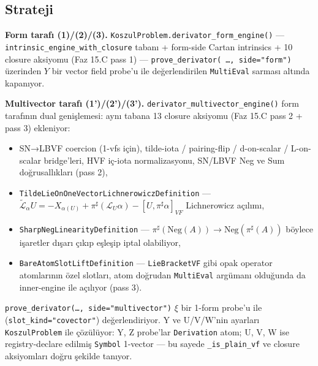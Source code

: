 \documentclass[11pt]{article}
\providecommand{\tightlist}{%
      \setlength{\itemsep}{0pt}\setlength{\parskip}{0pt}}
\begin{document}
    \subsection{Strateji}\label{strateji}

\textbf{Form tarafı (1)/(2)/(3).}
\texttt{KoszulProblem.derivator\_form\_engine()} ---
\texttt{intrinsic\_engine\_with\_closure} tabanı + form-side Cartan
intrinsics + 10 closure aksiyomu (Faz 15.C pass 1) ---
\texttt{prove\_derivator(\ …,\ side="form")} üzerinden \(Y\) bir vector
field probe'u ile değerlendirilen \texttt{MultiEval} sarması altında
kapanıyor.

\textbf{Multivector tarafı (1')/(2')/(3').}
\texttt{derivator\_multivector\_engine()} form tarafının dual
genişlemesi: aynı tabana 13 closure aksiyomu (Faz 15.C pass 2 + pass 3)
ekleniyor:

\begin{itemize}
\tightlist
\item
  SN→LBVF coercion (1-vfs için), tilde-iota / pairing-flip / d-on-scalar
  / L-on-scalar bridge'leri, HVF iç-iota normalizasyonu, SN/LBVF Neg ve
  Sum doğrusallıkları (pass 2),
\item
  \texttt{TildeLieOnOneVectorLichnerowiczDefinition} ---
  \(\tilde{\mathcal{L}}_\alpha U
  = -X_{\alpha(U)} + \pi^\sharp(\mathcal{L}_U \alpha) - [U, \pi^\sharp \alpha]_{VF}\)
  Lichnerowicz açılımı,
\item
  \texttt{SharpNegLinearityDefinition} ---
  \(\pi^\sharp(\mathrm{Neg}(A)) \to
  \mathrm{Neg}(\pi^\sharp(A))\) böylece işaretler dışarı çıkıp eşleşip
  iptal olabiliyor,
\item
  \texttt{BareAtomSlotLiftDefinition} --- \texttt{LieBracketVF} gibi
  opak operator atomlarının özel slotları, atom doğrudan
  \texttt{MultiEval} argümanı olduğunda da inner-engine ile açılıyor
  (pass 3).
\end{itemize}

\texttt{prove\_derivator(…,\ side="multivector")} \(\xi\) bir 1-form
probe'u ile (\texttt{slot\_kind="covector"}) değerlendiriyor. Y ve
U/V/W'nin ayarları \texttt{KoszulProblem} ile çözülüyor: Y, Z probe'lar
\texttt{Derivation} atom; U, V, W ise registry-declare edilmiş
\texttt{Symbol} 1-vector --- bu sayede \texttt{\_is\_plain\_vf} ve
closure aksiyomları doğru şekilde tanıyor.
\end{document}
